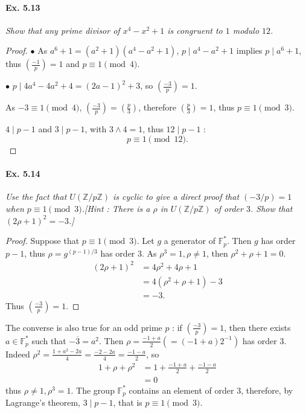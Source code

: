 \documentclass[11pt,a4paper]{article}
\newcommand{\Z}{\mathbb{Z}}
\newcommand{\F}{\mathbb{F}}
\newcommand{\legendre}[2]{\genfrac{(}{)}{}{}{#1}{#2}}
\begin{document}
\paragraph{Ex. 5.13}

{\it  Show that any prime divisor of $x^4 - x^2 + 1$ is congruent to $1$ modulo $12$.
}

\begin{proof}

$\bullet$ As $a^6 +1 = (a^2+1)(a^4-a^2+1)$, $p\mid a^4 - a^2+1$ implies $p \mid a^6 + 1$, thus $\legendre{-1}{p} = 1$ and $p\equiv 1 \pmod 4$.

$\bullet$ $p \mid 4a^4 - 4 a^2 +4 = (2a-1)^2 + 3$, so $\legendre{-3}{p} = 1$.

As $-3 \equiv 1 \pmod 4$, $\legendre{-3}{p} = \legendre{p}{3}$, therefore $\legendre{p}{3} = 1$, thus $p \equiv 1 \pmod 3$.

$4 \mid p-1$ and $3 \mid p-1$, with $3 \wedge 4 = 1$,  thus $12 \mid p-1$ : $$p \equiv 1 \pmod {12}.$$
\end{proof}

\paragraph{Ex. 5.14}

{\it Use the fact that $U(\Z/p\Z)$ is cyclic to give a direct proof that $(-3/p) = 1$ when $p \equiv 1 \pmod 3$.[Hint : There is a $\rho$ in $U(\Z/p\Z)$ of order $3$. Show that $(2\rho + 1)^2 = -3$.]
}

\begin{proof}
Suppose that $p\equiv 1 \pmod 3$. Let $g$ a generator of $\F_p^*$. Then $g$ has order $p-1$, thus $\rho = g^{(p-1)/3}$ has order $3$.
As $\rho^3 = 1,\rho\ne 1$, then $\rho^2+\rho+1 = 0$.
\begin{align*}
(2\rho + 1)^2 &= 4\rho^2+ 4\rho +1\\
&=4(\rho^2+\rho+1)-3\\
&=-3.
\end{align*}
Thus $\legendre{-3}{p} = 1$.
\end{proof}
The converse is also true for an odd prime $p$ :  if $\legendre{-3}{p} = 1$, then there exists $a\in \F_p^*$ such that $-\overline{3} =a^2$. Then $\rho = \frac{-1+a}{2} (=(-1+a)2^{-1})$ has order  $3$. Indeed
$\rho^2 = \frac{1+a^2-2a}{4} = \frac{-2-2a}{4} = \frac{-1-a}{2}$, so
\begin{align*}
1+\rho + \rho^2 &= 1 +  \frac{-1+a}{2}+ \frac{-1-a}{2}\\
&=0
\end{align*}
thus $\rho\ne1, \rho^3=1$.
The group $\F_p^*$ contains an element of order 3, therefore, by Lagrange's theorem, $3 \mid p-1$, that is $p\equiv 1 \pmod 3$.
\end{document}
